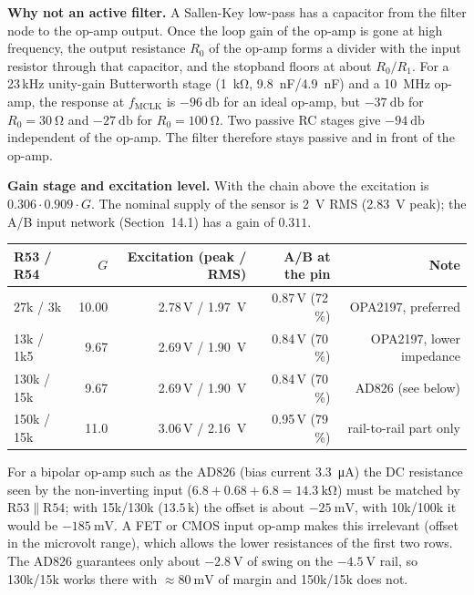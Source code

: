 \documentclass[11pt,a4paper]{article}
\begin{document}
\textbf{Why not an active filter.}  A Sallen-Key low-pass has a capacitor from the filter node
to the op-amp output.  Once the loop gain of the op-amp is gone at high frequency, the output
resistance $R_0$ of the op-amp forms a divider with the input resistor through that
capacitor, and the stopband floors at about $R_0/R_1$.  For a 23\,kHz unity-gain Butterworth
stage (\SI{1}{\kilo\ohm}, \SI{9.8}{\nano\farad}/\SI{4.9}{\nano\farad}) and a \SI{10}{\mega\hertz}
op-amp, the response at $f_{\mathrm{MCLK}}$ is $\SI{-96}{\decibel}$ for an ideal
op-amp, but $\SI{-37}{\decibel}$ for $R_0=\SI{30}{\ohm}$ and $\SI{-27}{\decibel}$ for
$R_0=\SI{100}{\ohm}$.  Two passive RC stages give $\SI{-94}{\decibel}$ independent of the
op-amp.  The filter therefore stays passive and in front of the op-amp.

\textbf{Gain stage and excitation level.}  With the chain above the excitation is
$0.306\cdot0.909\cdot G$.  The nominal supply of the sensor is \SI{2}{\volt} RMS
(\SI{2.83}{\volt} peak); the A/B input network (Section~14.1) has a gain of $0.311$.
\begin{center}
\small
\begin{tabular}{@{}lrrrr@{}}
\toprule
R53 / R54 & $G$ & Excitation (peak / RMS) & A/B at the pin & Note \\
\midrule
27k / 3k   & 10.00 & 2.78\,V / \SI{1.97}{\volt} & 0.87\,V (72\,\%) & OPA2197, preferred \\
13k / 1k5  & 9.67  & 2.69\,V / \SI{1.90}{\volt} & 0.84\,V (70\,\%) & OPA2197, lower impedance \\
130k / 15k & 9.67  & 2.69\,V / \SI{1.90}{\volt} & 0.84\,V (70\,\%) & AD826 (see below) \\
150k / 15k & 11.0  & 3.06\,V / \SI{2.16}{\volt} & 0.95\,V (79\,\%) & rail-to-rail part only \\
\bottomrule
\end{tabular}
\end{center}
For a bipolar op-amp such as the AD826 (bias current \SI{3.3}{\micro\ampere}) the DC
resistance seen by the non-inverting input ($6.8+0.68+6.8=\SI{14.3}{\kilo\ohm}$) must be
matched by $\mathrm{R53}\parallel\mathrm{R54}$; with 15k/130k ($13.5\,\mathrm{k}$) the
offset is about $\SI{-25}{\milli\volt}$, with 10k/100k it would be $\SI{-185}{\milli\volt}$.  A
FET or CMOS input op-amp makes this irrelevant (offset in the microvolt range), which allows
the lower resistances of the first two rows.  The AD826 guarantees only about $\SI{-2.8}{\volt}$
of swing on the $\SI{-4.5}{\volt}$ rail, so 130k/15k works there with $\approx\SI{80}{\milli\volt}$
of margin and 150k/15k does not.
\end{document}
